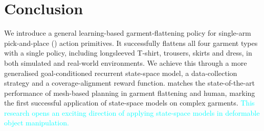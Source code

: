\documentclass[journal]{IEEEtran}
\newcommand{\addIncremental}[1]{\textcolor{cyan}{#1}}
\begin{document}

\section{Conclusion} \label{sec:conclusion}

We introduce a general learning-based garment-flattening policy  for single-arm pick-and-place () action primitives. It successfully flattens all four garment types with a single policy, including longsleeved T-shirt, trousers, skirts and dress, in both simulated and real-world environments. We achieve this through a more generalised goal-conditioned recurrent state-space model, a data-collection strategy and a coverage-alignment reward function.  matches the state-of-the-art performance of mesh-based planning in garment flattening and human, marking the first successful application of state-space models on complex garments. \addIncremental{This research opens an exciting direction of applying state-space models in deformable object manipulation.} 
\end{document}
